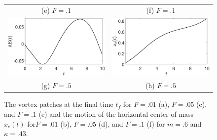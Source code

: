 \documentclass[a4paper,11pt]{article}
\begin{document}
\begin{figure}
\begin{tabular}{cc}
(e) $F=.1$ & (f) $F=.1$\\
 \includegraphics[width=.35\textwidth]{energy_wm_50_modu_pt6} & \includegraphics[width=.35\textwidth]{com_wm_50_modu_pt6}\\
(g) $F=.5$ & (h) $F=.5$
\end{tabular}
\caption{The vortex patches at the final time $t_{f}$ for $F=.01$ (a), $F=.05$ (c), and $F=.1$ (e) and the motion of the horizontal center of mass $x_{c}(t)$ for$F=.01$ (b), $F=.05$ (d), and $F=.1$ (f) for $\tilde{m}=.6$ and $\kappa = .43$.}
\label{fig:midsolvorticity}
\end{figure}

\end{document}
